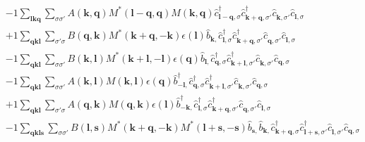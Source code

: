 \begin{align*}
	&-1 \sum_{ \mathbf{l} \mathbf{k} \mathbf{q} } \sum_{ \sigma \sigma' } A( \mathbf{k}, \mathbf{q} )  M^*( \mathbf{l}-\mathbf{q}, \mathbf{q} )  M( \mathbf{k}, \mathbf{q} )   \hat{c}_{ \mathbf{l}-\mathbf{q}, \sigma }^\dagger  \hat{c}_{ \mathbf{k}+\mathbf{q}, \sigma' }^\dagger  \hat{c}_{ \mathbf{k}, \sigma' }^{\phantom{\dagger}} \hat{c}_{ \mathbf{l}, \sigma }^{\phantom{\dagger}}  \\
	&+1 \sum_{ \mathbf{q} \mathbf{k} \mathbf{l} } \sum_{ \sigma' \sigma } B( \mathbf{q}, \mathbf{k} )  M^*( \mathbf{k}+\mathbf{q}, -\mathbf{k} )  \epsilon( \mathbf{l} )   \hat{b}_{ \mathbf{k}, }^{\phantom{\dagger}} \hat{c}_{ \mathbf{l}, \sigma }^\dagger  \hat{c}_{ \mathbf{k}+\mathbf{q}, \sigma' }^\dagger  \hat{c}_{ \mathbf{q}, \sigma' }^{\phantom{\dagger}} \hat{c}_{ \mathbf{l}, \sigma }^{\phantom{\dagger}}  \\
	&-1 \sum_{ \mathbf{q} \mathbf{k} \mathbf{l} } \sum_{ \sigma \sigma' } B( \mathbf{k}, \mathbf{l} )  M^*( \mathbf{k}+\mathbf{l}, -\mathbf{l} )  \epsilon( \mathbf{q} )   \hat{b}_{ \mathbf{l}, }^{\phantom{\dagger}} \hat{c}_{ \mathbf{q}, \sigma }^\dagger  \hat{c}_{ \mathbf{k}+\mathbf{l}, \sigma' }^\dagger  \hat{c}_{ \mathbf{k}, \sigma' }^{\phantom{\dagger}} \hat{c}_{ \mathbf{q}, \sigma }^{\phantom{\dagger}}  \\
	&-1 \sum_{ \mathbf{q} \mathbf{k} \mathbf{l} } \sum_{ \sigma \sigma' } A( \mathbf{k}, \mathbf{l} )  M( \mathbf{k}, \mathbf{l} )  \epsilon( \mathbf{q} )   \hat{b}_{ -\mathbf{l}, }^\dagger  \hat{c}_{ \mathbf{q}, \sigma }^\dagger  \hat{c}_{ \mathbf{k}+\mathbf{l}, \sigma' }^\dagger  \hat{c}_{ \mathbf{k}, \sigma' }^{\phantom{\dagger}} \hat{c}_{ \mathbf{q}, \sigma }^{\phantom{\dagger}}  \\
	&+1 \sum_{ \mathbf{q} \mathbf{k} \mathbf{l} } \sum_{ \sigma' \sigma } A( \mathbf{q}, \mathbf{k} )  M( \mathbf{q}, \mathbf{k} )  \epsilon( \mathbf{l} )   \hat{b}_{ -\mathbf{k}, }^\dagger  \hat{c}_{ \mathbf{l}, \sigma }^\dagger  \hat{c}_{ \mathbf{k}+\mathbf{q}, \sigma' }^\dagger  \hat{c}_{ \mathbf{q}, \sigma' }^{\phantom{\dagger}} \hat{c}_{ \mathbf{l}, \sigma }^{\phantom{\dagger}}  \\
	&-1 \sum_{ \mathbf{q} \mathbf{k} \mathbf{l} \mathbf{s} } \sum_{ \sigma \sigma' } B( \mathbf{l}, \mathbf{s} )  M^*( \mathbf{k}+\mathbf{q}, -\mathbf{k} )  M^*( \mathbf{l}+\mathbf{s}, -\mathbf{s} )   \hat{b}_{ \mathbf{s}, }^{\phantom{\dagger}} \hat{b}_{ \mathbf{k}, }^{\phantom{\dagger}} \hat{c}_{ \mathbf{k}+\mathbf{q}, \sigma }^\dagger  \hat{c}_{ \mathbf{l}+\mathbf{s}, \sigma' }^\dagger  \hat{c}_{ \mathbf{l}, \sigma' }^{\phantom{\dagger}} \hat{c}_{ \mathbf{q}, \sigma }^{\phantom{\dagger}}  \\

\end{align*}
